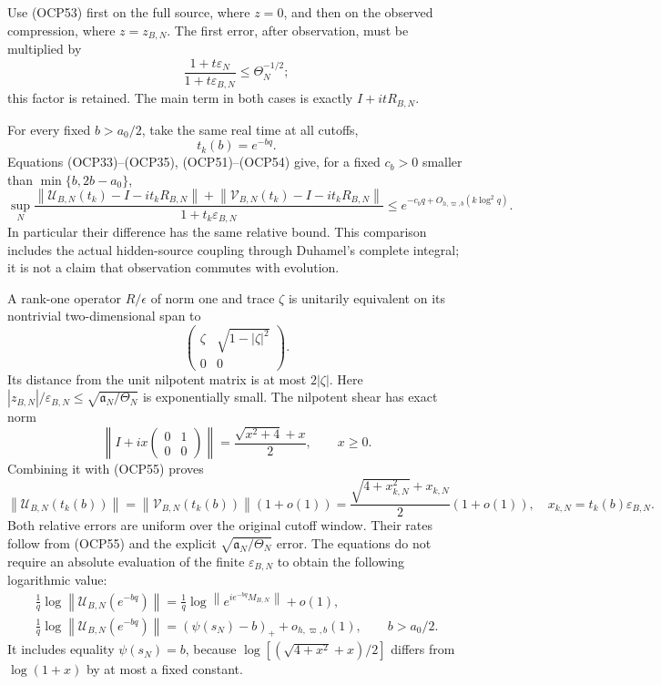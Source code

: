 \documentclass[11pt]{article}
\newcommand{\eps}{\varepsilon}
\newcommand{\norm}[1]{\left\lVert#1\right\rVert}
\begin{document}
Use (OCP53) first on the full source, where $z=0$, and then on the observed compression, where $z=z_{B,N}$. The first error, after observation, must be multiplied by
\[
 \frac{1+t\eps_N}{1+t\eps_{B,N}}
 \le\Theta_N^{-1/2};
 \tag{OCP54}
\]
this factor is retained. The main term in both cases is exactly $I+itR_{B,N}$.

For every fixed $b>a_0/2$, take the same real time at all cutoffs,
\[
 t_k(b)=e^{-bq}.
\]
Equations (OCP33)--(OCP35), (OCP51)--(OCP54) give, for a fixed $c_b>0$ smaller than $\min\{b,2b-a_0\}$,
\[
 \boxed{
 \sup_N\frac{
 \norm{\mathscr U_{B,N}(t_k)-I-it_kR_{B,N}}
 +\norm{\mathscr V_{B,N}(t_k)-I-it_kR_{B,N}}
 }{1+t_k\eps_{B,N}}
 \le e^{-c_bq+O_{h,\varpi,b}(k\log^2q)}.}
 \tag{OCP55}
\]
In particular their difference has the same relative bound. This comparison includes the actual hidden-source coupling through Duhamel's complete integral; it is not a claim that observation commutes with evolution.

A rank-one operator $R/\epsilon$ of norm one and trace $\zeta$ is unitarily equivalent on its nontrivial two-dimensional span to
\[
 \begin{pmatrix}\zeta&\sqrt{1-|\zeta|^2}\\0&0\end{pmatrix}.
\]
Its distance from the unit nilpotent matrix is at most $2|\zeta|$. Here $|z_{B,N}|/\eps_{B,N}\le\sqrt{\mathfrak a_N/\Theta_N}$ is exponentially small. The nilpotent shear has exact norm
\[
 \left\|I+ix\begin{pmatrix}0&1\\0&0\end{pmatrix}\right\|
 =\frac{\sqrt{x^2+4}+x}{2},\qquad x\ge0.
 \tag{OCP56}
\]
Combining it with (OCP55) proves
\[
 \boxed{
 \norm{\mathscr U_{B,N}(t_k(b))}
 =\norm{\mathscr V_{B,N}(t_k(b))}(1+o(1))
 =\frac{\sqrt{4+x_{k,N}^2}+x_{k,N}}{2}(1+o(1)),
 \quad x_{k,N}=t_k(b)\eps_{B,N}.}
 \tag{OCP57}
\]
Both relative errors are uniform over the original cutoff window. Their rates follow from (OCP55) and the explicit $\sqrt{\mathfrak a_N/\Theta_N}$ error. The equations do not require an absolute evaluation of the finite $\eps_{B,N}$ to obtain the following logarithmic value:
\[
 \boxed{\begin{gathered}
 \frac1q\log\norm{\mathscr U_{B,N}(e^{-bq})}
 =\frac1q\log\norm{e^{ie^{-bq}M_{B,N}}}+o(1),\\
 \frac1q\log\norm{\mathscr U_{B,N}(e^{-bq})}
 =(\psi(s_N)-b)_++o_{h,\varpi,b}(1),\qquad b>a_0/2.
 \end{gathered}}
 \tag{OCP58}
\]
It includes equality $\psi(s_N)=b$, because
$\log[(\sqrt{4+x^2}+x)/2]$ differs from $\log(1+x)$ by at most a fixed constant.
\end{document}
